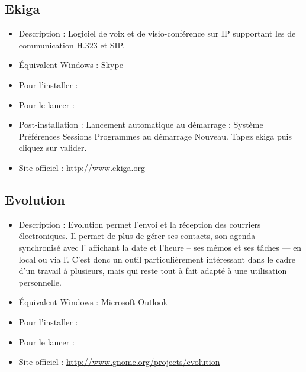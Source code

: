 \subsection{Ekiga}
\begin{itemize}
\begingroup
{}
\item Description : Logiciel de voix et de visio-conférence sur IP supportant les  de communication H.323 et SIP.{\par}
\item Équivalent Windows : Skype{\par}
\item Pour l'installer : 
\item Pour le lancer : 
\item Post-installation : Lancement automatique au démarrage : Système \FlecheDroite  Préférences \FlecheDroite Sessions \FlecheDroite Programmes au démarrage \FlecheDroite Nouveau. Tapez ekiga puis cliquez sur valider.{\par}
\item Site officiel : \url{http://www.ekiga.org}{\par}
\endgroup
\end{itemize}

\subsection{Evolution}
\begin{itemize}
\begingroup
{}
\item Description : Evolution permet l'envoi et la réception des courriers électroniques. Il permet de plus de gérer ses contacts, son agenda -- synchronisé avec l' affichant la date et l'heure -- ses mémos et ses tâches --- en local ou via l'. C'est donc un outil particulièrement intéressant dans le cadre d'un travail à plusieurs, mais qui reste tout à fait adapté à une utilisation personnelle.{\par}
\item Équivalent Windows : Microsoft Outlook{\par}
\item Pour l'installer : 
\item Pour le lancer : 
\item Site officiel : \url{http://www.gnome.org/projects/evolution}{\par}
\endgroup
\end{itemize}

